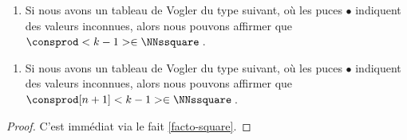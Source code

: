 \begin{fact} \label{vogler-sub-square}
	\leavevmode
	\begin{enumerate}
		\item Si nous avons un tableau de Vogler du type suivant, où les puces $\bullet$ indiquent des valeurs inconnues, alors nous pouvons affirmer que $\consprod<k-1> \in \NNssquare$\,.
	\end{enumerate}

	\begin{center}
	\end{center}


	\begin{enumerate}
		\item Si nous avons un tableau de Vogler du type suivant, où les puces $\bullet$ indiquent des valeurs inconnues, alors nous pouvons affirmer que $\consprod[n+1]<k-1> \in \NNssquare$\,.
	\end{enumerate}

	\begin{center}
	\end{center}
\end{fact}


\begin{proof}
	C'est immédiat via le fait \ref{facto-square}.
\end{proof}




